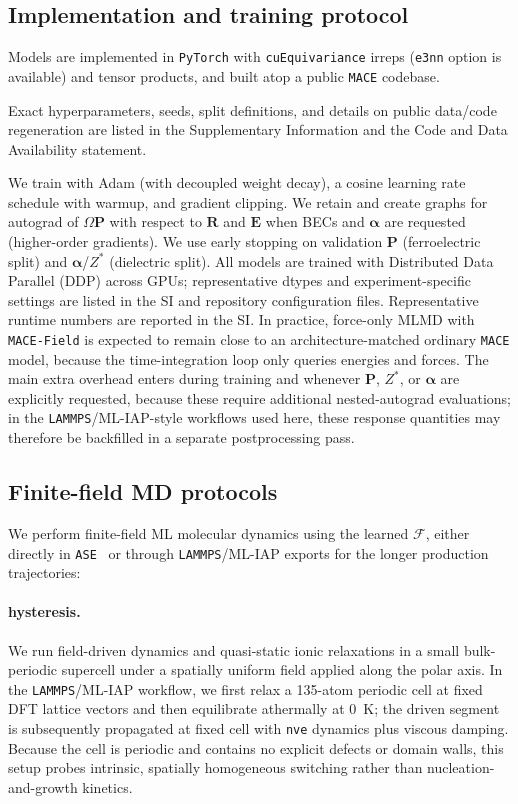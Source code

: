 \documentclass[aps,physrev,graphicx,amsmath,amssymb,
               reprint,superscriptaddress]{revtex4-2}
\begin{document}
\subsection{Implementation and training protocol}
Models are implemented in \texttt{PyTorch} with \texttt{cuEquivariance} irreps (\texttt{e3nn} option is available) and tensor products, and built atop a public \texttt{MACE} codebase.

Exact hyperparameters, seeds, split definitions, and details on public data/code regeneration are listed in the Supplementary Information and the Code and Data Availability statement.

We train with Adam (with decoupled weight decay), a cosine learning rate schedule with warmup, and gradient clipping. We retain and create graphs for autograd of $\Omega\mathbf P$ with respect to $\mathbf R$ and $\mathbf E$ when BECs and $\boldsymbol\alpha$ are requested (higher-order gradients). We use early stopping on validation $\mathbf P$ (ferroelectric split) and $\boldsymbol\alpha$/$Z^*$ (dielectric split). All models are trained with Distributed Data Parallel (DDP) across GPUs; representative dtypes and experiment-specific settings are listed in the SI and repository configuration files.
Representative runtime numbers are reported in the SI. In practice, force-only MLMD with \texttt{MACE-Field} is expected to remain close to an architecture-matched ordinary \texttt{MACE} model, because the time-integration loop only queries energies and forces. The main extra overhead enters during training and whenever $\mathbf P$, $Z^*$, or $\boldsymbol\alpha$ are explicitly requested, because these require additional nested-autograd evaluations; in the \texttt{LAMMPS}/ML-IAP-style workflows used here, these response quantities may therefore be backfilled in a separate postprocessing pass.

\subsection{Finite-field MD protocols}
\label{sec:md-protocols}

We perform finite-field ML molecular dynamics using the learned $\mathcal F$, either directly in \texttt{ASE}~\cite{larsen2017ase} or through \texttt{LAMMPS}/ML-IAP exports for the longer production trajectories:
\\

\paragraph*{ hysteresis.}
We run field-driven dynamics and quasi-static ionic relaxations in a small bulk-periodic supercell under a spatially uniform field applied along the polar axis. In the \texttt{LAMMPS}/ML-IAP workflow, we first relax a 135-atom periodic cell at fixed DFT lattice vectors and then equilibrate athermally at 0~\si{K}; the driven segment is subsequently propagated at fixed cell with \texttt{nve} dynamics plus viscous damping. Because the cell is periodic and contains no explicit defects or domain walls, this setup probes intrinsic, spatially homogeneous switching rather than nucleation-and-growth kinetics.
\\
\end{document}
